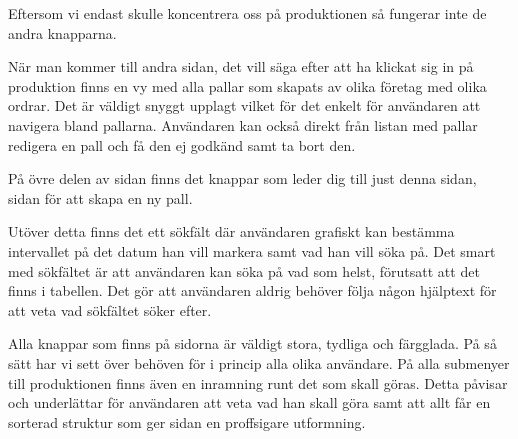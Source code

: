 Eftersom vi endast skulle koncentrera oss på produktionen så fungerar inte de andra knapparna. 

När man kommer till andra sidan, det vill säga efter att ha klickat sig in på produktion finns en vy med alla pallar som skapats av olika företag med olika ordrar. Det är väldigt snyggt upplagt vilket för det enkelt för användaren att navigera bland pallarna. Användaren kan också direkt från listan med pallar redigera en pall och få den ej godkänd samt ta bort den. 

På övre delen av sidan finns det knappar som leder dig till just denna sidan, sidan för att skapa en ny pall. 

Utöver detta finns det ett sökfält där användaren grafiskt kan bestämma intervallet på det datum han vill markera samt vad han vill söka på. Det smart med sökfältet är att användaren kan söka på vad som helst, förutsatt att det finns i tabellen. Det gör att användaren aldrig behöver följa någon hjälptext för att veta vad sökfältet söker efter. 

Alla knappar som finns på sidorna är väldigt stora, tydliga och färgglada. På så sätt har vi sett över behöven för i princip alla olika användare. På alla submenyer till produktionen finns även en inramning runt det som skall göras. Detta påvisar och underlättar för användaren att veta vad han skall göra samt att allt får en sorterad struktur som ger sidan en proffsigare utformning. 